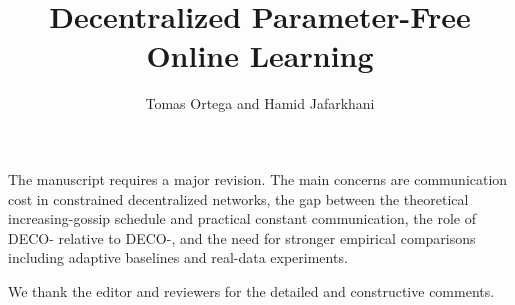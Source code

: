 \documentclass[12pt,english]{reviewresponse}
\title{Decentralized Parameter-Free Online Learning}
\author{Tomas Ortega and Hamid Jafarkhani}
\newcommand{\algname}{{DECO}\xspace}
\begin{document}
\maketitle


\clearpage
\tableofcontents
\clearpage

\editor{}
\begin{generalcomment}
    The manuscript requires a major revision. The main concerns are communication cost in constrained decentralized networks, the gap between the theoretical increasing-gossip schedule and practical constant communication, the role of \algname{}- relative to \algname{}-, and the need for stronger empirical comparisons including adaptive baselines and real-data experiments.
\end{generalcomment}
\begin{revresponse}
    We thank the editor and reviewers for the detailed and constructive comments.


\end{revresponse}
\end{document}
